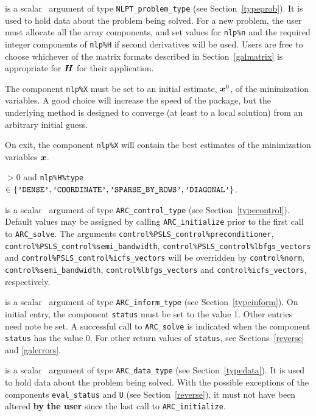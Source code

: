 \documentclass{galahad}
\newcommand{\packagename}{ARC}
\begin{document}
\vspace*{-2mm}
\begin{description}
 is a scalar \intentinout\ argument of type
{\tt NLPT\_problem\_type}
(see Section~\ref{typeprob}).
It is used to hold data about the problem being solved.
For a new problem, the user must allocate all the array components,
and set values for {\tt nlp\%n}
and the required integer components of {\tt nlp\%H} if second derivatives
will be used.
Users are free to choose whichever
of the matrix formats described in Section~\ref{galmatrix}
is appropriate for ${\bm{H}}$ for their application.

\noindent
The component {\tt nlp\%X} must be set to an initial estimate, ${\bm{x}}^{0}$,
of the minimization variables. A good choice will increase the speed
of the package, but the underlying method is designed to converge (at least
to a local solution) from an arbitrary initial guess.

\noindent
On exit, the component {\tt nlp\%X} will contain the best estimates of the
minimization variables ${\bm{x}}$.

\noindent
{} $> 0$ and
{\tt nlp\%H\%type} $\in \{
  \mbox{\tt 'DENSE'}, \mbox{\tt 'COORDINATE'}, \mbox{\tt 'SPARSE\_BY\_ROWS'},
  \mbox{\tt 'DIAGONAL'} \}$.

 is a scalar \intentin\ argument of type
{\tt \packagename\_control\_type}
(see Section~\ref{typecontrol}). Default values may be assigned by calling
{\tt \packagename\_initialize} prior to the first call to
{\tt \packagename\_solve}. The arguments
{\tt control\%PSLS\_control\-\%preconditioner},
{\tt control\%PSLS\_control\%semi\_bandwidth},
{\tt control\%PSLS\_control\%lbfgs\_vectors} and
{\tt control\%PSLS\_control\%icfs\_vectors}
will be overridden by
{\tt control\%norm},
{\tt control\%semi\_bandwidth},
{\tt control\%lbfgs\_vectors} and
{\tt control\%icfs\_vectors}, respectively.

 is a scalar \intentinout\ argument of type
{\tt \packagename\_inform\_type}
(see Section~\ref{typeinform}).
On initial entry, the  component {\tt status} must be set to the value 1.
Other entries need note be set.
A successful call to
{\tt \packagename\_solve}
is indicated when the  component {\tt status} has the value 0.
For other return values of {\tt status}, see Sections~\ref{reverse} and
\ref{galerrors}.

 is a scalar \intentinout\ argument of type
{\tt \packagename\_data\_type}
(see Section~\ref{typedata}). It is used to hold data about the problem being
solved. With the possible exceptions of the components
{\tt eval\_status} and {\tt U} (see Section~\ref{reverse}),
it must not have been altered {\bf by the user} since the last call to
{\tt \packagename\_initialize}.


\end{description}
\end{document}
